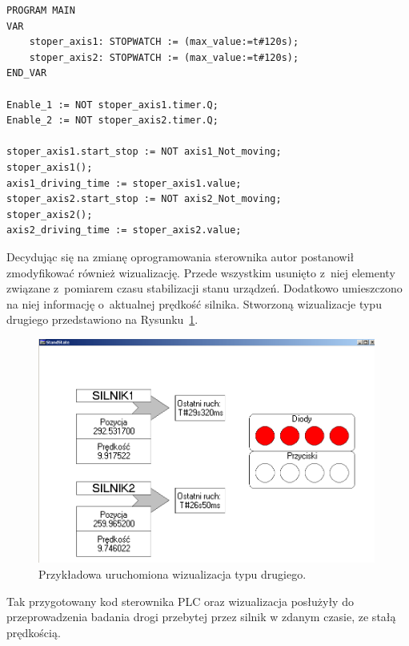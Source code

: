 \vspace{5mm}
\begin{lstlisting}[caption={Oprogramowanie odmierzające drogę przebytą w zadanym czasie.},label=servoDist]
PROGRAM MAIN
VAR
	stoper_axis1: STOPWATCH := (max_value:=t#120s);
	stoper_axis2: STOPWATCH := (max_value:=t#120s);
END_VAR

Enable_1 := NOT stoper_axis1.timer.Q;
Enable_2 := NOT stoper_axis2.timer.Q;

stoper_axis1.start_stop := NOT axis1_Not_moving;
stoper_axis1();
axis1_driving_time := stoper_axis1.value;
stoper_axis2.start_stop := NOT axis2_Not_moving;
stoper_axis2();
axis2_driving_time := stoper_axis2.value;
\end{lstlisting}

\clearpage
Decydując się na zmianę oprogramowania sterownika autor postanowił zmodyfikować również wizualizację. Przede wszystkim usunięto z~niej elementy związane z~pomiarem czasu stabilizacji stanu urządzeń. Dodatkowo umieszczono na niej informację o~aktualnej prędkość silnika.
Stworzoną wizualizacje typu drugiego przedstawiono na Rysunku~\ref{vis2_inuse}.
\begin{figure}[!htb] 	\centering 	\includegraphics[width=0.99\textwidth]{images/vis2_inuse} \caption{Przykładowa uruchomiona wizualizacja typu drugiego.} \label{vis2_inuse} \end{figure}

\noindent Tak przygotowany kod sterownika PLC oraz wizualizacja posłużyły do przeprowadzenia badania drogi przebytej przez silnik w zdanym czasie, ze stałą prędkością. 
%
%

